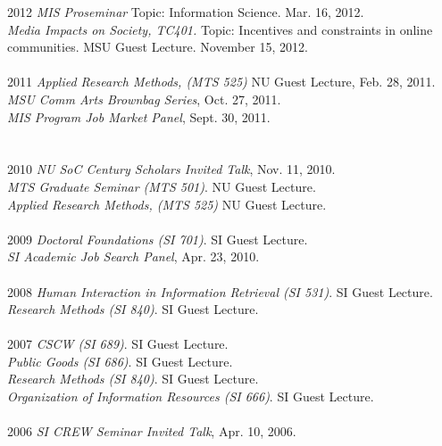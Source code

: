 \documentclass[9pt]{extarticle}
\begin{document}
\begin{tabbing}
2012 \hspace{0.3in}\=  \emph{MIS Proseminar} Topic: Information Science. Mar. 16, 2012.\\
\> \emph{Media Impacts on Society, TC401.} Topic: Incentives and constraints in online \\
\> \hspace{0.5cm} communities. MSU Guest Lecture. November 15, 2012. \\\\

2011 \hspace{0.3in}\= \emph{Applied Research Methods, (MTS 525)} NU Guest Lecture, Feb. 28, 2011. \\
\> \emph{MSU Comm Arts Brownbag Series}, Oct. 27, 2011. \\
\> \emph{MIS Program Job Market Panel}, Sept. 30, 2011. \\\\\\

2010 \hspace{0.3in}\= \emph{NU SoC Century Scholars Invited Talk}, Nov. 11, 2010. \\
\> \emph{MTS Graduate Seminar (MTS 501)}. NU Guest Lecture. \\
\> \emph{Applied Research Methods, (MTS 525)} NU Guest Lecture. \\\\

2009 \hspace{0.3in}\= \emph{Doctoral Foundations (SI 701)}. SI Guest Lecture. \\
\> \emph{SI Academic Job Search Panel}, Apr. 23, 2010. \\\\

2008 \hspace{0.3in}\= \emph{Human Interaction in Information Retrieval (SI 531)}. SI Guest Lecture. \\
\> \emph{Research Methods (SI 840)}. SI Guest Lecture. \\\\

2007 \hspace{0.3in}\= \emph{CSCW (SI 689)}. SI Guest Lecture. \\
\> \emph{Public Goods (SI 686)}. SI Guest Lecture. \\
\> \emph{Research Methods (SI 840)}. SI Guest Lecture. \\
\> \emph{Organization of Information Resources (SI 666)}. SI Guest Lecture. \\\\

2006 \hspace{0.3in}\= \emph{SI CREW Seminar Invited Talk}, Apr. 10, 2006. \\
\end{tabbing}
\end{document}
